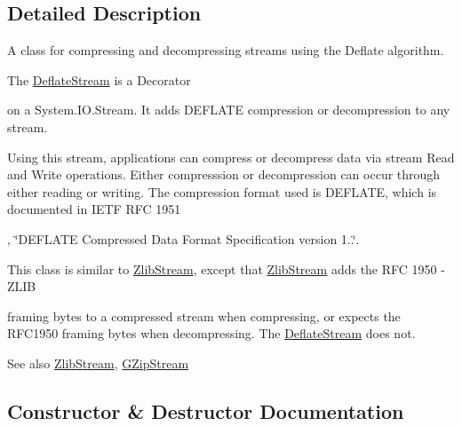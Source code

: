 \subsection{Detailed Description}
A class for compressing and decompressing streams using the Deflate algorithm. 

The \mbox{\hyperlink{class_super_tiled2_unity_1_1_ionic_1_1_zlib_1_1_deflate_stream}{Deflate\+Stream}} is a Decorator

on a System.\+I\+O.\+Stream. It adds D\+E\+F\+L\+A\+TE compression or decompression to any stream. 

Using this stream, applications can compress or decompress data via stream {\ttfamily Read} and {\ttfamily Write} operations. Either compresssion or decompression can occur through either reading or writing. The compression format used is D\+E\+F\+L\+A\+TE, which is documented in I\+E\+TF R\+FC 1951

, \char`\"{}\+D\+E\+F\+L\+A\+T\+E
  Compressed Data Format Specification version 1..\char`\"{}. 

This class is similar to \mbox{\hyperlink{class_super_tiled2_unity_1_1_ionic_1_1_zlib_1_1_zlib_stream}{Zlib\+Stream}}, except that {\ttfamily \mbox{\hyperlink{class_super_tiled2_unity_1_1_ionic_1_1_zlib_1_1_zlib_stream}{Zlib\+Stream}}} adds the R\+FC 1950 -\/ Z\+L\+IB

framing bytes to a compressed stream when compressing, or expects the R\+F\+C1950 framing bytes when decompressing. The {\ttfamily \mbox{\hyperlink{class_super_tiled2_unity_1_1_ionic_1_1_zlib_1_1_deflate_stream}{Deflate\+Stream}}} does not. 

\begin{DoxySeeAlso}{See also}
\mbox{\hyperlink{class_super_tiled2_unity_1_1_ionic_1_1_zlib_1_1_zlib_stream}{Zlib\+Stream}}, \mbox{\hyperlink{class_super_tiled2_unity_1_1_ionic_1_1_zlib_1_1_g_zip_stream}{G\+Zip\+Stream}}


\end{DoxySeeAlso}


\subsection{Constructor \& Destructor Documentation}
\mbox{\label{class_super_tiled2_unity_1_1_ionic_1_1_zlib_1_1_deflate_stream_af95bf312acc17bc60b20767178959549}} 
